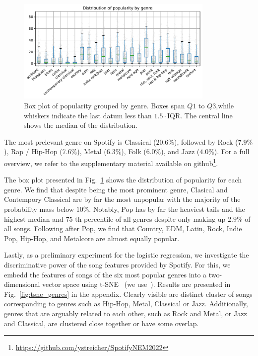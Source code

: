 \documentclass{article}
\begin{document}
\begin{figure}
  \centering
  \includegraphics[width=0.85\textwidth]{../figures/popularity_distribution_by_genre.pdf}
  \caption{Box plot of popularity grouped by genre. Boxes span $Q1$ to $Q3$,while whiskers indicate the last datum less than $1.5\cdot\text{IQR}$. The central line shows the median of the distribution.}
  \label{fig:genre_boxplot}
\end{figure}

The most prelevant genre on Spotify is Classical ($20.6\%$), followed by Rock ($7.9\%$), Rap / Hip-Hop ($7.6\%$), Metal ($6.3\%$), Folk ($6.0\%$), and Jazz ($4.0\%$). For a full overview, we refer to the supplementary material available on github\footnote{\url{https://github.com/ystreicher/SpotifyNEM2022}}.

The box plot presented in Fig.~\ref{fig:genre_boxplot} shows the distribution of popularity for each genre. We find that despite  being the most prominent genre, Clasical and Contempory Classical are by far the most unpopular with the majority of the probability mass below $10\%$. Notably, Pop has by far the heaviest tails and the highest median and $75$-th percentile of all genres despite only making up $2.9\%$ of all songs. Following after Pop, we find that Country, EDM, Latin, Rock, Indie Pop, Hip-Hop, and Metalcore are almost equally popular.  

Lastly, as a preliminary experiment for the logistic regression, we investigate the discriminative power of the song features provided by Spotify. For this, we embedd the features of songs of the six most popular genres into a two-dimensional vector space using t-SNE~\cite{van2008visualizing} (we use~\cite{Policar731877}). Results are presented in Fig.~\ref{fig:tsne_genres} in the appendix. Clearly visible are distinct cluster of songs corresponding to genres such as Hip-Hop, Metal, Classical or Jazz. Additionally, genres that are arguably related to each other, such as Rock and Metal, or Jazz and Classical, are clustered close together or have some overlap.
\end{document}
